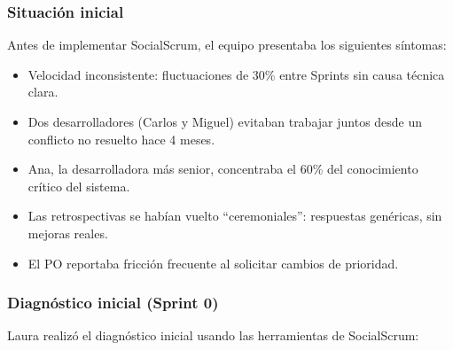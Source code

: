\subsubsection{Situación inicial}

Antes de implementar SocialScrum, el equipo presentaba los siguientes síntomas:

\begin{itemize}
    \item Velocidad inconsistente: fluctuaciones de 30\% entre Sprints sin causa técnica clara.
    \item Dos desarrolladores (Carlos y Miguel) evitaban trabajar juntos desde un conflicto no resuelto hace 4 meses.
    \item Ana, la desarrolladora más senior, concentraba el 60\% del conocimiento crítico del sistema.
    \item Las retrospectivas se habían vuelto ``ceremoniales'': respuestas genéricas, sin mejoras reales.
    \item El PO reportaba fricción frecuente al solicitar cambios de prioridad.
\end{itemize}

\subsubsection{Diagnóstico inicial (Sprint 0)}

Laura realizó el diagnóstico inicial usando las herramientas de SocialScrum:

